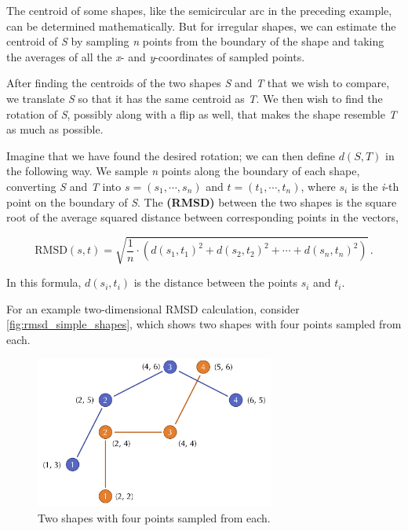 \begin{qbox}\end{qbox}

The centroid of some shapes, like the semicircular arc in the preceding example, can be determined mathematically. But for irregular shapes, we can estimate the centroid of \textit{S} by sampling \textit{n} points from the boundary of the shape and taking the averages of all the \textit{x}- and \textit{y}-coordinates of sampled points.

After finding the centroids of the two shapes \textit{S} and \textit{T} that we wish to compare, we translate \textit{S} so that it has the same centroid as \textit{T}. We then wish to find the rotation of \textit{S}, possibly along with a flip as well, that makes the shape resemble \textit{T} as much as possible.

Imagine that we have found the desired rotation; we can then define $d(S, T)$ in the following way. We sample \textit{n} points along the boundary of each shape, converting \textit{S} and \textit{T} into  $s = (s_{1}, \cdots, s_{n})$ and $t = (t_{1}, \cdots, t_{n})$, where $s_{i}$ is the \textit{i}-th point on the boundary of \textit{S}. The  \textbf{(RMSD)} between the two shapes is the square root of the average squared distance between corresponding points in the vectors,

$$\text{RMSD}(s, t) = \sqrt{\dfrac{1}{n} \cdot (d(s_1, t_1)^2 + d(s_2, t_2)^2 + \cdots + d(s_n, t_n)^2)}\,. $$

In this formula, $d(s_{i}, t_{i})$ is the distance between the points $s_{i}$ and $t_{i}$.

\begin{note}\end{note}

For an example two-dimensional RMSD calculation, consider \autoref{fig:rmsd_simple_shapes}, which shows two shapes with four points sampled from each.

\begin{figure}[h]
	\centering
	\mySfFamily
	\includegraphics[width = 0.7\textwidth]{../images/rmsd_simple_shapes.png}
	\caption{Two shapes with four points sampled from each.}
	\label{fig:rmsd_simple_shapes}
\end{figure}


